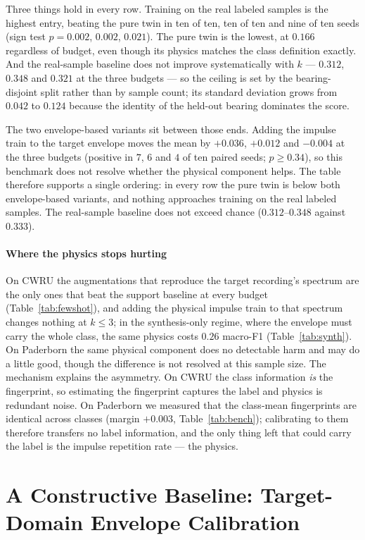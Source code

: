 \documentclass[journal]{IEEEtran}
\begin{document}
Three things hold in every row. Training on the real labeled samples is the
highest entry, beating the pure twin in ten of ten, ten of ten and nine of ten
seeds (sign test $p=0.002$, $0.002$, $0.021$). The pure twin is the lowest, at
$0.166$ regardless of budget, even though its physics matches the class
definition exactly. And the real-sample baseline does not improve systematically
with $k$ --- $0.312$, $0.348$ and $0.321$ at the three budgets --- so the
ceiling is set by the bearing-disjoint split rather than by sample count; its
standard deviation grows from $0.042$ to $0.124$ because the identity of the
held-out bearing dominates the score.

The two envelope-based variants sit between those ends. Adding the impulse
train to the target envelope moves the mean by $+0.036$, $+0.012$ and $-0.004$
at the three budgets (positive in $7$, $6$ and $4$ of ten paired seeds;
$p\ge 0.34$), so this benchmark does not resolve whether the physical component
helps. The table therefore supports a single ordering: in every row the pure
twin is below both envelope-based variants, and nothing approaches training on
the real labeled samples. The real-sample baseline does not exceed chance
($0.312$--$0.348$ against $0.333$).

\paragraph{Where the physics stops hurting}
On CWRU the augmentations that reproduce the target recording's spectrum are
the only ones that beat the support baseline at every budget
(Table~\ref{tab:fewshot}), and adding the physical impulse train to that
spectrum changes nothing at $k\le3$; in the synthesis-only regime, where the
envelope must carry the whole class, the same physics costs $0.26$ macro-F1
(Table~\ref{tab:synth}). On Paderborn the same physical component does no
detectable harm and may do a little good, though the difference is not resolved
at this sample size. The mechanism explains the asymmetry. On CWRU the
class information \emph{is} the fingerprint, so estimating the fingerprint
captures the label and physics is redundant noise. On Paderborn we measured
that the class-mean fingerprints are identical across classes (margin $+0.003$,
Table~\ref{tab:bench}); calibrating to them therefore transfers no label
information, and the only thing left that could carry the label is the impulse
repetition rate --- the physics.

\section{A Constructive Baseline: Target-Domain Envelope Calibration}
\label{sec:method}
\end{document}
